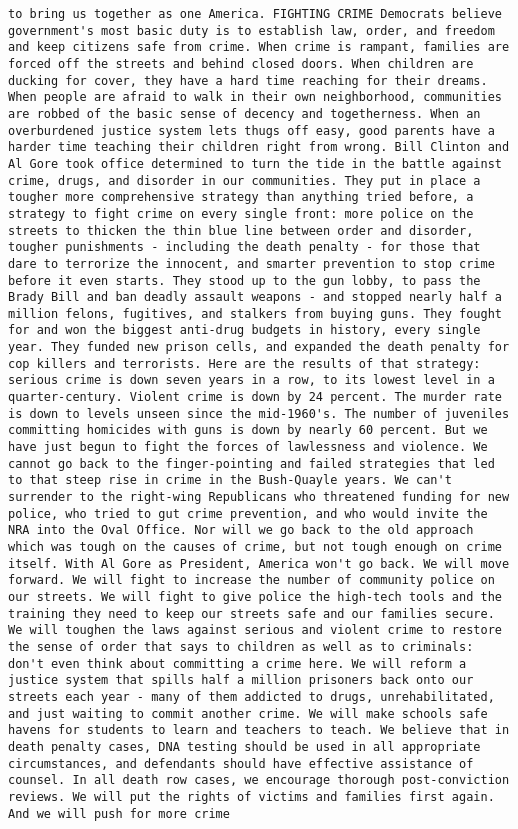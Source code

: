 \documentclass[
]{article}
\begin{document}
\begin{verbatim}
to bring us together as one America. FIGHTING CRIME Democrats believe government's most basic duty is to establish law, order, and freedom and keep citizens safe from crime. When crime is rampant, families are forced off the streets and behind closed doors. When children are ducking for cover, they have a hard time reaching for their dreams. When people are afraid to walk in their own neighborhood, communities are robbed of the basic sense of decency and togetherness. When an overburdened justice system lets thugs off easy, good parents have a harder time teaching their children right from wrong. Bill Clinton and Al Gore took office determined to turn the tide in the battle against crime, drugs, and disorder in our communities. They put in place a tougher more comprehensive strategy than anything tried before, a strategy to fight crime on every single front: more police on the streets to thicken the thin blue line between order and disorder, tougher punishments - including the death penalty - for those that dare to terrorize the innocent, and smarter prevention to stop crime before it even starts. They stood up to the gun lobby, to pass the Brady Bill and ban deadly assault weapons - and stopped nearly half a million felons, fugitives, and stalkers from buying guns. They fought for and won the biggest anti-drug budgets in history, every single year. They funded new prison cells, and expanded the death penalty for cop killers and terrorists. Here are the results of that strategy: serious crime is down seven years in a row, to its lowest level in a quarter-century. Violent crime is down by 24 percent. The murder rate is down to levels unseen since the mid-1960's. The number of juveniles committing homicides with guns is down by nearly 60 percent. But we have just begun to fight the forces of lawlessness and violence. We cannot go back to the finger-pointing and failed strategies that led to that steep rise in crime in the Bush-Quayle years. We can't surrender to the right-wing Republicans who threatened funding for new police, who tried to gut crime prevention, and who would invite the NRA into the Oval Office. Nor will we go back to the old approach which was tough on the causes of crime, but not tough enough on crime itself. With Al Gore as President, America won't go back. We will move forward. We will fight to increase the number of community police on our streets. We will fight to give police the high-tech tools and the training they need to keep our streets safe and our families secure. We will toughen the laws against serious and violent crime to restore the sense of order that says to children as well as to criminals: don't even think about committing a crime here. We will reform a justice system that spills half a million prisoners back onto our streets each year - many of them addicted to drugs, unrehabilitated, and just waiting to commit another crime. We will make schools safe havens for students to learn and teachers to teach. We believe that in death penalty cases, DNA testing should be used in all appropriate circumstances, and defendants should have effective assistance of counsel. In all death row cases, we encourage thorough post-conviction reviews. We will put the rights of victims and families first again. And we will push for more crime 
\end{verbatim}
\end{document}
